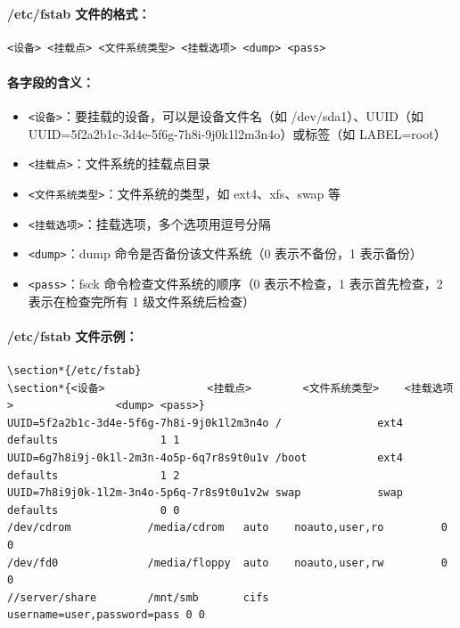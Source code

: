 \documentclass[12pt,UTF8]{ctexbook}
\begin{document}
\paragraph{/etc/fstab 文件的格式：}
\begin{verbatim}
<设备> <挂载点> <文件系统类型> <挂载选项> <dump> <pass>
\end{verbatim}

\paragraph{各字段的含义：}
\begin{itemize}
    \item \verb+<设备>+：要挂载的设备，可以是设备文件名（如 /dev/sda1）、UUID（如 UUID=5f2a2b1c-3d4e-5f6g-7h8i-9j0k1l2m3n4o）或标签（如 LABEL=root）
    \item \verb+<挂载点>+：文件系统的挂载点目录
    \item \verb+<文件系统类型>+：文件系统的类型，如 ext4、xfs、swap 等
    \item \verb+<挂载选项>+：挂载选项，多个选项用逗号分隔
    \item \verb+<dump>+：dump 命令是否备份该文件系统（0 表示不备份，1 表示备份）
    \item \verb+<pass>+：fsck 命令检查文件系统的顺序（0 表示不检查，1 表示首先检查，2 表示在检查完所有 1 级文件系统后检查）
\end{itemize}

\paragraph{/etc/fstab 文件示例：}
\begin{verbatim}
\section*{/etc/fstab}
\section*{<设备>                <挂载点>        <文件系统类型>    <挂载选项>                <dump> <pass>}
UUID=5f2a2b1c-3d4e-5f6g-7h8i-9j0k1l2m3n4o /               ext4    defaults                1 1
UUID=6g7h8i9j-0k1l-2m3n-4o5p-6q7r8s9t0u1v /boot           ext4    defaults                1 2
UUID=7h8i9j0k-1l2m-3n4o-5p6q-7r8s9t0u1v2w swap            swap    defaults                0 0
/dev/cdrom            /media/cdrom   auto    noauto,user,ro         0 0
/dev/fd0              /media/floppy  auto    noauto,user,rw         0 0
//server/share        /mnt/smb       cifs    username=user,password=pass 0 0
\end{verbatim}
\end{document}
